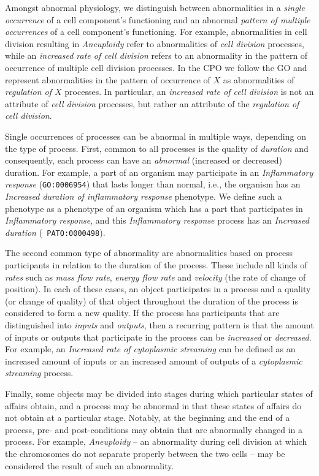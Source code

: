 \documentclass{bioinfo}
\begin{document}
Amongst abnormal physiology, we distinguish between abnormalities in a
{\em single occurrence} of a cell component's functioning and an
abnormal {\em pattern of multiple occurrences} of a cell component's
functioning. For example, abnormalities in cell division resulting in
{\em Aneuploidy} refer to abnormalities of {\em cell division}
processes, while an {\em increased rate of cell division} refers to an
abnormality in the pattern of occurrence of multiple cell division
processes. In the CPO we follow the GO and represent abnormalities in
the pattern of occurrence of $X$ as abnormalities of {\em regulation
  of $X$} processes. In particular, an {\em increased rate of cell
  division} is not an attribute of {\em cell division} processes, but
rather an attribute of the {\em regulation of cell division}.

Single occurrences of processes can be abnormal in multiple ways,
depending on the type of process.
%
First, common to all processes is the quality of {\em duration} and
consequently, each process can have an {\em abnormal} (increased or
decreased) duration. For example, a part of an organism may
participate in an {\em Inflammatory response} ({\tt GO:0006954}) that
lasts longer than normal, i.e., the organism has an {\em Increased
  duration of inflammatory response} phenotype. We define such a
phenotype as a phenotype of an organism which has a part that
participates in {\em Inflammatory response}, and this {\em
  Inflammatory response} process has an {\em Increased duration} ({\tt
  PATO:0000498}).

The second common type of abnormality are abnormalities based on
process participants in relation to the duration of the process. These
include all kinds of {\em rates} such as {\em mass flow rate}, {\em
  energy flow rate} and {\em velocity} (the rate of change of
position). In each of these cases, an object participates in a process
and a quality (or change of quality) of that object throughout the
duration of the process is considered to form a new quality. If the
process has participants that are distinguished into {\em inputs} and
{\em outputs}, then a recurring pattern is that the amount of inputs
or outputs that participate in the process can be {\em increased} or
{\em decreased}. For example, an {\em Increased rate of cytoplasmic
  streaming} can be defined as an increased amount of inputs or an
increased amount of outputs of a {\em cytoplasmic streaming} process.

Finally, some objects may be divided into stages during which
particular states of affairs obtain, and a process may be abnormal in
that these states of affairs do not obtain at a particular
stage. Notably, at the beginning and the end of a process, pre- and
post-conditions may obtain that are abnormally changed in a
process. For example, {\em Aneuploidy} -- an abnormality during cell
division at which the chromosomes do not separate properly between the
two cells -- may be considered the result of such an abnormality.
\end{document}
